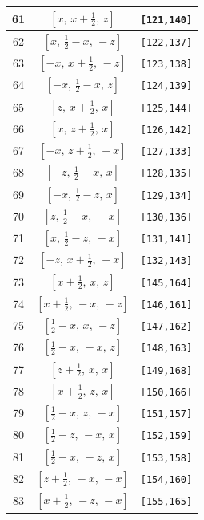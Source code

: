 \documentclass[fleqn,8pt]{jsarticle}
\begin{document}
\begin{longtable}{ccc}
61 & $\left[ x,\, x + \frac{1}{2},\, z \right]$ & {\tt [121,140]} \\ \hline
62 & $\left[ x,\, \frac{1}{2} - x,\, - z \right]$ & {\tt [122,137]} \\ \hline
63 & $\left[ - x,\, x + \frac{1}{2},\, - z \right]$ & {\tt [123,138]} \\ \hline
64 & $\left[ - x,\, \frac{1}{2} - x,\, z \right]$ & {\tt [124,139]} \\ \hline
65 & $\left[ z,\, x + \frac{1}{2},\, x \right]$ & {\tt [125,144]} \\ \hline
66 & $\left[ x,\, z + \frac{1}{2},\, x \right]$ & {\tt [126,142]} \\ \hline
67 & $\left[ - x,\, z + \frac{1}{2},\, - x \right]$ & {\tt [127,133]} \\ \hline
68 & $\left[ - z,\, \frac{1}{2} - x,\, x \right]$ & {\tt [128,135]} \\ \hline
69 & $\left[ - x,\, \frac{1}{2} - z,\, x \right]$ & {\tt [129,134]} \\ \hline
70 & $\left[ z,\, \frac{1}{2} - x,\, - x \right]$ & {\tt [130,136]} \\ \hline
71 & $\left[ x,\, \frac{1}{2} - z,\, - x \right]$ & {\tt [131,141]} \\ \hline
72 & $\left[ - z,\, x + \frac{1}{2},\, - x \right]$ & {\tt [132,143]} \\ \hline
73 & $\left[ x + \frac{1}{2},\, x,\, z \right]$ & {\tt [145,164]} \\ \hline
74 & $\left[ x + \frac{1}{2},\, - x,\, - z \right]$ & {\tt [146,161]} \\ \hline
75 & $\left[ \frac{1}{2} - x,\, x,\, - z \right]$ & {\tt [147,162]} \\ \hline
76 & $\left[ \frac{1}{2} - x,\, - x,\, z \right]$ & {\tt [148,163]} \\ \hline
77 & $\left[ z + \frac{1}{2},\, x,\, x \right]$ & {\tt [149,168]} \\ \hline
78 & $\left[ x + \frac{1}{2},\, z,\, x \right]$ & {\tt [150,166]} \\ \hline
79 & $\left[ \frac{1}{2} - x,\, z,\, - x \right]$ & {\tt [151,157]} \\ \hline
80 & $\left[ \frac{1}{2} - z,\, - x,\, x \right]$ & {\tt [152,159]} \\ \hline
81 & $\left[ \frac{1}{2} - x,\, - z,\, x \right]$ & {\tt [153,158]} \\ \hline
82 & $\left[ z + \frac{1}{2},\, - x,\, - x \right]$ & {\tt [154,160]} \\ \hline
83 & $\left[ x + \frac{1}{2},\, - z,\, - x \right]$ & {\tt [155,165]} \\ \hline

\end{longtable}
\end{document}
